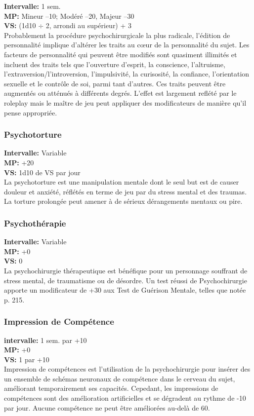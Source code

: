  \textbf{Intervalle:} 1 sem.\\ \textbf{MP:} Mineur –10; Modéré –20, Majeur –30 \\ \textbf{VS:} (1d10 $\div$ 2, arrondi au supérieur) + 3 \\ Probablement la procédure psychochirurgicale la plus radicale, l'édition de personnalité implique d'altérer les traits au cœur de la personnalité du sujet. Les facteurs de personnalité qui peuvent être modifiés sont quasiment illimités et incluent des traits tels que l'ouverture d'esprit, la conscience, l'altruisme, l'extraversion/l'introversion, l'impulsivité, la curisosité, la confiance, l'orientation sexuelle et le contrôle de soi, parmi tant d'autres. Ces traits peuvent être augmentés ou atténués à différents degrés. L'effet est largement reflété par le roleplay mais le maître de jeu peut appliquer des modificateurs de manière qu'il pense appropriée. 

\subsubsection{Psychotorture} \textbf{Intervalle:} Variable \\ \textbf{MP:} +20 \\ \textbf{VS:} 1d10 de VS par jour\\ La psychotorture est une manipulation mentale dont le seul but est de causer douleur et anxiété, réflétés en terme de jeu par du stress mental et des traumas. La torture prolongée peut amener à de sérieux dérangements mentaux ou pire. 

\subsubsection{Psychothérapie} \textbf{Intervalle:} Variable \\ \textbf{MP:} +0 \\ \textbf{VS:} 0 \\ La psychochirurgie thérapeutique est bénéfique pour un personnage souffrant de stress mental, de traumatisme ou de désordre. Un test réussi de Psychochirurgie apporte un modificateur de +30 aux Test de Guérison Mentale, telles que notée p. 215. 

\subsubsection{Impression de Compétence} \textbf{intervalle:} 1 sem. par +10 \\ \textbf{MP:} +0 \\ \textbf{VS:} 1 par +10\\ Impression de compétences est l'utilisation de la psychochirurgie pour insérer des un ensemble de schémas neuronaux de compétence dans le cerveau du sujet, améliorant temporairement ses capacités. Cepedant, les impressions de compétences sont des amélioration artificielles et se dégradent au rythme de -10 par jour. Aucune compétence ne peut être améliorées au-delà de 60. 

